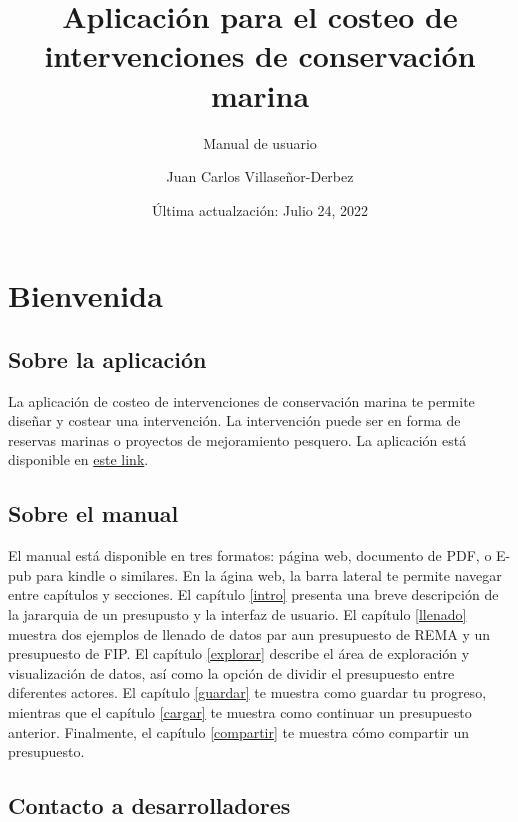 \documentclass[
]{book}
\title{Aplicación para el costeo de intervenciones de conservación marina}
\subtitle{Manual de usuario}
\author{Juan Carlos Villaseñor-Derbez}
\date{Última actualzación: Julio 24, 2022}
\begin{document}
\maketitle

{
\setcounter{tocdepth}{1}
\tableofcontents
}
\hypertarget{bienvenida}{%
\chapter{Bienvenida}\label{bienvenida}}

\hypertarget{sobre-la-aplicaciuxf3n}{%
\section{Sobre la aplicación}\label{sobre-la-aplicaciuxf3n}}

La aplicación de costeo de intervenciones de conservación marina te permite diseñar y costear una intervención. La intervención puede ser en forma de reservas marinas o proyectos de mejoramiento pesquero. La aplicación está disponible en \href{https://innovacionazul.shinyapps.io/AppCosteo/}{este link}.

\hypertarget{sobre-el-manual}{%
\section{Sobre el manual}\label{sobre-el-manual}}

El manual está disponible en tres formatos: página web, documento de PDF, o E-pub para kindle o similares. En la ágina web, la barra lateral te permite navegar entre capítulos y secciones. El capítulo \ref{intro} presenta una breve descripción de la jararquia de un presupusto y la interfaz de usuario. El capítulo \ref{llenado} muestra dos ejemplos de llenado de datos par aun presupuesto de REMA y un presupuesto de FIP. El capítulo \ref{explorar} describe el área de exploración y visualización de datos, así como la opción de dividir el presupuesto entre diferentes actores. El capítulo \ref{guardar} te muestra como guardar tu progreso, mientras que el capítulo \ref{cargar} te muestra como continuar un presupuesto anterior. Finalmente, el capítulo \ref{compartir} te muestra cómo compartir un presupuesto.

\hypertarget{contacto-a-desarrolladores}{%
\section{Contacto a desarrolladores}\label{contacto-a-desarrolladores}}
\end{document}
